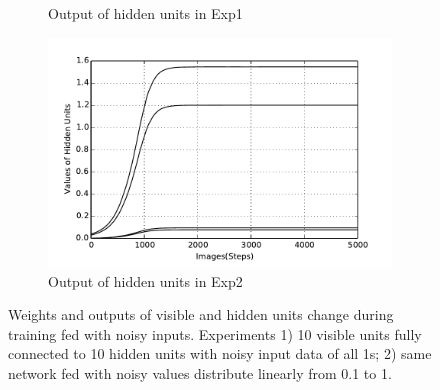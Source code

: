 \begin{figure}
\begin{subfigure}[t]{0.4\textwidth}
			\caption{Output of hidden units in Exp1}
		\end{subfigure}
		\begin{subfigure}[t]{0.4\textwidth}
			\includegraphics[width=\textwidth]{pics_ae/exp2_hid_noisy.pdf}
			\caption{Output of hidden units in Exp2}
		\end{subfigure}
		\caption{Weights and outputs of visible and hidden units change during training fed with noisy inputs. 
			Experiments 1) 10 visible units fully connected to 10 hidden units with noisy input data of all 1s; 2) same network fed with noisy values distribute linearly from 0.1 to 1.}
	\end{figure}
	
